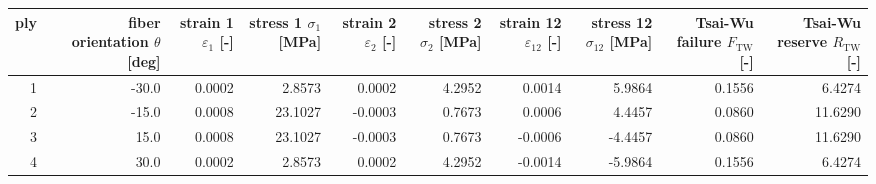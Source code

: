 \begin{tabular}{rrrrrrrrrr}
\toprule
ply & fiber orientation $\theta$ [deg] & strain 1 $\varepsilon_1$ [-] & stress 1 $\sigma_1$ [MPa] & strain 2 $\varepsilon_2$ [-] & stress 2 $\sigma_2$ [MPa] & strain 12 $\varepsilon_{12}$ [-] & stress 12 $\sigma_{12}$ [MPa] & Tsai-Wu failure $F_\mathrm{TW}$ [-] & Tsai-Wu reserve $R_\mathrm{TW}$ [-] \\
\midrule
  1 &                            -30.0 &                       0.0002 &                    2.8573 &                       0.0002 &                    4.2952 &                           0.0014 &                        5.9864 &                              0.1556 &                              6.4274 \\
  2 &                            -15.0 &                       0.0008 &                   23.1027 &                      -0.0003 &                    0.7673 &                           0.0006 &                        4.4457 &                              0.0860 &                             11.6290 \\
  3 &                             15.0 &                       0.0008 &                   23.1027 &                      -0.0003 &                    0.7673 &                          -0.0006 &                       -4.4457 &                              0.0860 &                             11.6290 \\
  4 &                             30.0 &                       0.0002 &                    2.8573 &                       0.0002 &                    4.2952 &                          -0.0014 &                       -5.9864 &                              0.1556 &                              6.4274 \\
\bottomrule
\end{tabular}
